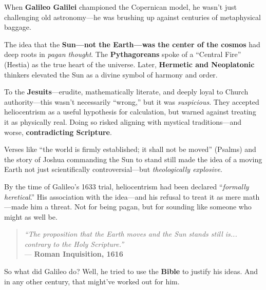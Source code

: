 \begin{tcolorbox}[title=Galileo and the Pagan Sun: When Heresy Orbited Scripture, colback=gray!5, colframe=black, fonttitle=\bfseries, breakable]

  When \textbf{Galileo Galilei} championed the Copernican model, he wasn’t just challenging old astronomy—he was brushing up against centuries of metaphysical baggage.

  \medskip
  
  The idea that the \textbf{Sun—not the Earth—was the center of the cosmos} had deep roots in \textit{pagan thought}. The \textbf{Pythagoreans} spoke of a “Central Fire” (Hestia) as the true heart of the universe. Later, \textbf{Hermetic and Neoplatonic} thinkers elevated the Sun as a divine symbol of harmony and order.

  \medskip
  
  To the \textbf{Jesuits}—erudite, mathematically literate, and deeply loyal to Church authority—this wasn’t necessarily “wrong,” but it was \textit{suspicious}. They accepted heliocentrism as a useful hypothesis for calculation, but warned against treating it as physically real. Doing so risked aligning with mystical traditions—and worse, \textbf{contradicting Scripture}.

  \medskip
  
  Verses like “the world is firmly established; it shall not be moved” (Psalms) and the story of Joshua commanding the Sun to stand still made the idea of a moving Earth not just scientifically controversial—but \textit{theologically explosive}.
  
  \medskip
  
  By the time of Galileo’s 1633 trial, heliocentrism had been declared “\textit{formally heretical}.” His association with the idea—and his refusal to treat it as mere math—made him a threat. Not for being pagan, but for sounding like someone who might as well be.
  
  \begin{quote}
  \textit{“The proposition that the Earth moves and the Sun stands still is... contrary to the Holy Scripture.”} \\
  — \textbf{Roman Inquisition, 1616}
  \end{quote}
  
\end{tcolorbox}

\medskip

So what did Galileo do? Well, he tried to use the \textbf{Bible} to justify his ideas. And in any other century, that might’ve worked out for him.  

